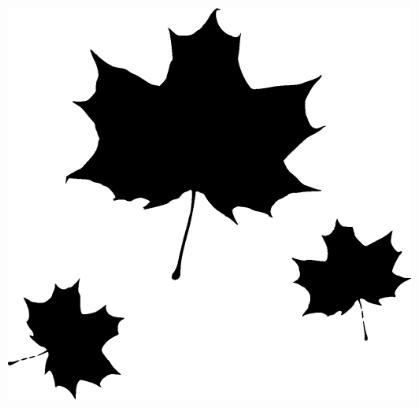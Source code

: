\documentclass[a5paper, 8pt, twocolumn]{book} %
\numberwithin{equation}{section}
\begin{document}
\vspace{2cm}
{
\centering
\includegraphics[width=0.8\textwidth]{vaahteranlehdet.eps}
}
\vspace{1cm}
\end{document}
